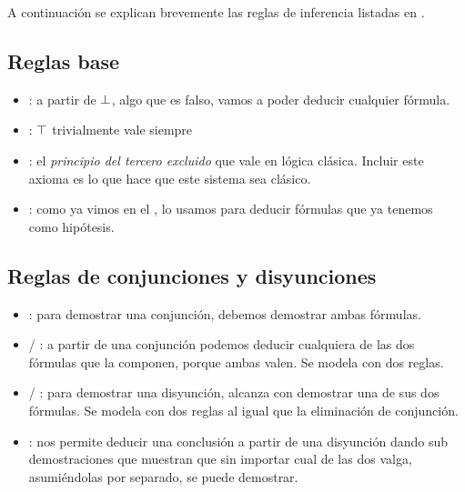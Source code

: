 A continuación se explican brevemente las reglas de inferencia listadas en .

\subsection{Reglas base}

\begin{multicols}{2}
    \proofTreeFalseE
    \proofTreeTrueI
\end{multicols}

\begin{multicols}{2}
    \proofTreeLEM
    \proofTreeAx
\end{multicols}

\begin{itemize}
    \item {}: a partir de $\bot$, algo que es falso, vamos a poder deducir cualquier
    fórmula.
    \item {}: $\top$ trivialmente vale siempre
    \item {}: el \textit{principio del tercero excluido} que vale en
    lógica clásica. Incluir este axioma es lo que hace que este sistema sea
    clásico.
    \item {}: como ya vimos en el , lo usamos para
    deducir fórmulas que ya tenemos como hipótesis.
\end{itemize}

\subsection{Reglas de conjunciones y disyunciones}

\proofTreeAndI

\begin{multicols}{2}
    \proofTreeAndEOne
    \proofTreeAndETwo
\end{multicols}

\begin{multicols}{2}
    \proofTreeOrIOne
    \proofTreeOrITwo
\end{multicols}

\proofTreeOrE

\begin{itemize}
    \item {}: para demostrar una conjunción, debemos demostrar ambas fórmulas.
    \item {} / : a partir de una conjunción podemos
    deducir cualquiera de las dos fórmulas que la componen, porque ambas valen.
    Se modela con dos reglas.
    \item {} / : para demostrar una disyunción, alcanza con
    demostrar una de sus dos fórmulas. Se modela con dos reglas al igual que la
    eliminación de conjunción.
    \item {}: nos permite deducir una conclusión a partir de una
    disyunción dando sub demostraciones que muestran que sin importar cual de
    las dos valga, asumiéndolas por separado, se puede demostrar.
\end{itemize}

